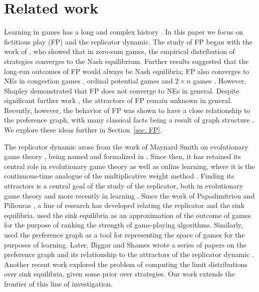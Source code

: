 \section{Related work}
\label{sec: related}

Learning in games has a long and complex history \cite{cesa2006prediction}. In this paper we focus on fictitious play (FP) and the replicator dynamic. The study of FP began with the work of \cite{brown1949some,robinson_iterative_1951}, who showed that in zero-sum games, the empirical distribution of strategies converges to the Nash equilibrium. Further results suggested that the long-run outcomes of FP would always be Nash equilibria; FP also converges to NEs in congestion games \cite{rosenthal_class_1973}, ordinal potential games \cite{berger_two_2007,monderer_potential_1996} and $2\times n$ games \cite{berger_fictitious_2005}. However, Shapley \cite{shapley_topics_1964} demonstrated that FP does not converge to NEs in general. Despite significant further work \cite{gaunersdorfer_fictitious_1995,hofbauer_time_2009,benaim_learning_2009,benaim_perturbations_2012,viossat_no-regret_2013}, the attractors of FP remain unknown in general. Recently, however, the behavior of FP was shown to have a close relationship to the preference graph, with many classical facts being a result of graph structure \cite{biggar_preference_2025}. We explore these ideas further in Section~\ref{sec: FP}.

The replicator dynamic arose from the work of Maynard Smith on evolutionary game theory \cite{smith1973logic}, being named and formalized in \cite{taylor_evolutionary_1978}. Since then, it has retained its central role in evolutionary game theory \cite{sandholm2010population,hofbauer_evolutionary_2003} as well as online learning, where it is the continuous-time analogue of the multiplicative weight method \cite{arora_multiplicative_2012}. Finding its attractors is a central goal of the study of the replicator, both in evolutionary game theory \cite{zeeman_population_1980,sandholm2010population} and more recently in learning \cite{papadimitriou2016nash,papadimitriou_nash_2018}. Since the work of Papadimitriou and Piliouras \cite{papadimitriou_game_2019}, a line of research has developed relating the replicator and the sink equilibria. \cite{omidshafiei_-rank_2019} used the sink equilibria as an approximation of the outcome of games for the purpose of ranking the strength of game-playing algorithms. Similarly, \cite{omidshafiei_navigating_2020} used the preference graph as a tool for representing the space of games for the purposes of learning. Later, Biggar and Shames wrote a series of papers on the preference graph and its relationship to the attractors of the replicator dynamic \cite{biggar_graph_2023,biggar_replicator_2023,biggar_attractor_2024}. Another recent work \cite{hakim2024swim} explored the problem of computing the limit distributions over sink equilibria, given some prior over strategies. Our work extends the frontier of this line of investigation.